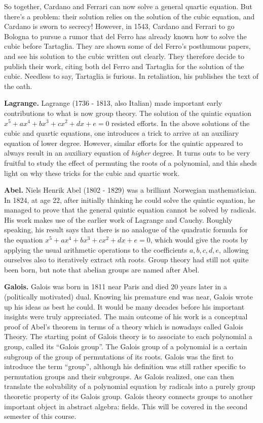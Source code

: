 \documentclass[11pt, reqno]{amsart}
\theoremstyle{remark}
\numberwithin{equation}{subsection}
\numberwithin{figure}{section}
\numberwithin{table}{section}
\newcommand{\sss}{\vspace{2.5 mm}}
\begin{document}
So together, Cardano and Ferrari can now solve a general quartic equation. But there's a problem: their solution relies on the solution of the cubic equation, and Cardano is sworn to secrecy!
However, in 1543, Cardano and Ferrari to go Bologna to pursue a rumor that del Ferro has already known how to solve the cubic before Tartaglia. They are shown some of del Ferro's posthumous papers, and see his solution to the cubic written out clearly.
They therefore decide to publish their work, citing both del Ferro and Tartaglia for the solution of the cubic.
Needless to say, Tartaglia is furious. In retaliation, his publishes the text of the oath.

\sss

\textbf{Lagrange.} Lagrange (1736 - 1813, also Italian) made important early contributions to what is now group theory. The solution of the quintic equation $x^5 + ax^4 + bx^3 + cx^2 + dx + e = 0$ resisted efforts.
In the above solutions of the cubic and quartic equations, one introduces a trick to arrive at an auxiliary equation of lower degree.
However, similar efforts for the quintic appeared to always result in an auxiliary equation of {\em higher} degree.
It turns outs to be very fruitful to study the effect of permuting the roots of a polynomial, and this sheds light on why these tricks for the cubic and quartic work.

\sss

\textbf{Abel.} Niels Henrik Abel (1802 - 1829) was a brilliant Norwegian mathematician. In 1824, at age 22, after initially thinking he could solve the quintic equation, he managed to prove that the general quintic equation cannot be solved by radicals. His work makes use of the earlier work of Lagrange and Cauchy. Roughly speaking, his result says that there is no analogue of the quadratic formula for the equation $x^5 + ax^4 + bx^3 + cx^2 + dx + e = 0$, which would give the roots by applying the usual arithmetic operations to the coefficients $a,b,c,d,e$, allowing ourselves also to iteratively extract $n$th roots.
Group theory had still not quite been born, but note that abelian groups are named after Abel.

\sss

\textbf{Galois.} Galois was born in 1811 near Paris and died 20 years later in a (politically motivated) dual. Knowing his premature end was near, Galois wrote up his ideas as best he could. It would be many decades before his important insights were truly appreciated.
The main outcome of his work is a conceptual proof of Abel's theorem in terms of a theory which is nowadays called Galois Theory.
The starting point of Galois theory is to associate to each polynomial a group, called its ``Galois group''. 
The Galois group of a polynomial is a certain subgroup of the group of permutations of its roots.
Galois was the first to introduce the term ``group'', although his definition was still rather specific to permutation groups and their subgroups. 
As Galois realized, one can then translate the solvability of a polynomial equation by radicals into a purely group theoretic property of its Galois group. 
Galois theory connects groups to another important object in abstract algebra: fields. This will be covered in the second semester of this course.
\end{document}
